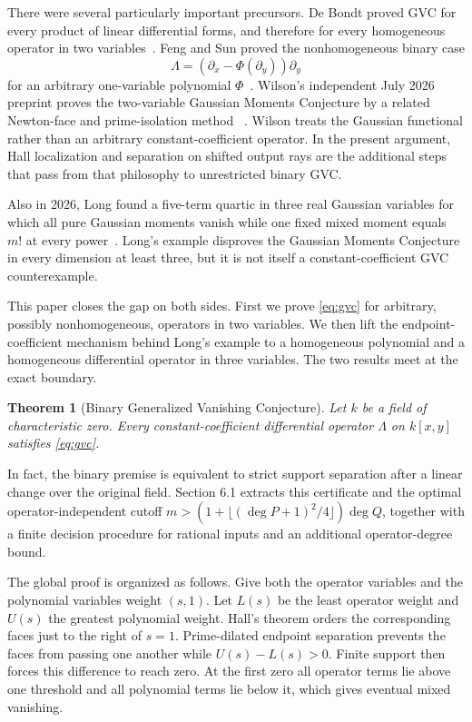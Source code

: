 \documentclass[11pt]{article}
\newtheorem{theorem}{Theorem}[section]
\begin{document}
There were several particularly important precursors.  De Bondt proved GVC
for every product of linear differential forms, and therefore for every
homogeneous operator in two variables~\cite{deBondt}.  Feng and Sun proved
the nonhomogeneous binary case
\[
 \Lambda=(\partial_x-\Phi(\partial_y))\partial_y
\]
for an arbitrary one-variable polynomial $\Phi$~\cite{FengSun}.  Wilson's
independent July 2026 preprint proves the two-variable Gaussian Moments
Conjecture by a related Newton-face and prime-isolation method
~\cite{WilsonGMC}.  Wilson treats the Gaussian functional rather than an
arbitrary constant-coefficient operator.  In the present argument, Hall
localization and separation on shifted output rays are the additional steps
that pass from that philosophy to unrestricted binary GVC.

Also in 2026, Long found a five-term quartic in three real Gaussian variables for which
all pure Gaussian moments vanish while one fixed mixed moment equals $m!$
at every power~\cite{LongGMC}.  Long's example disproves the Gaussian
Moments Conjecture in every dimension at least three, but it is not itself a
constant-coefficient GVC counterexample.

This paper closes the gap on both sides.  First we prove \eqref{eq:gvc} for
arbitrary, possibly nonhomogeneous, operators in two variables.  We then
lift the endpoint-coefficient mechanism behind Long's example to a
homogeneous polynomial and a homogeneous differential operator in three
variables.  The two results meet at the exact boundary.

\begin{theorem}[Binary Generalized Vanishing Conjecture]\label{thm:main}
Let $k$ be a field of characteristic zero.  Every constant-coefficient
differential operator $\Lambda$ on $k[x,y]$ satisfies
\eqref{eq:gvc}.
\end{theorem}

In fact, the binary premise is equivalent to strict support separation
after a linear change over the original field.  Section 6.1 extracts this
certificate and the optimal operator-independent cutoff
$m>(1+\lfloor(\deg P+1)^2/4\rfloor)\deg Q$, together with a finite
decision procedure for rational inputs and an additional operator-degree bound.

The global proof is organized as follows.  Give both
the operator variables and the polynomial variables weight $(s,1)$.  Let
$L(s)$ be the least operator weight and $U(s)$ the greatest polynomial
weight.  Hall's theorem orders the corresponding faces just to the right of
$s=1$.  Prime-dilated endpoint separation prevents the faces from passing
one another while $U(s)-L(s)>0$.  Finite support then forces this difference
to reach zero.  At the first zero all operator terms lie above one threshold
and all polynomial terms lie below it, which gives eventual mixed
vanishing.
\end{document}
